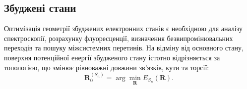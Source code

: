%
%
%
%
%
%
%
%

\subsection{Збуджені стани}

Оптимізація геометрії збуджених електронних станів є необхідною для
аналізу спектроскопії, розрахунку флуоресценції, визначення безвипромінювальних переходів та пошуку міжсистемних перетинів.
На відміну від основного стану, поверхня потенційної енергії збудженого
стану істотно відрізняється за топологією, що змінює рівноважні довжини
зв'язків, кути та торсії:
\[
\mathbf R^{(S_n)}_0 = \arg\min_{\mathbf R} E_{S_n}(\mathbf R).
\]

